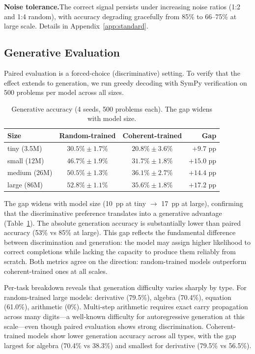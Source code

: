 \documentclass{article}
\begin{document}
\textbf{Noise tolerance.}\quad The correct signal persists under increasing noise ratios (1:2 and 1:4 random), with accuracy degrading gracefully from 85\% to 66--75\% at large scale. Details in Appendix~\ref{app:standard}.

\subsection{Generative Evaluation}
\label{sec:generative}

Paired evaluation is a forced-choice (discriminative) setting. To verify that the effect extends to generation, we run greedy decoding with SymPy verification on 500 problems per model across all sizes.

\begin{table}[t]
\centering
\begin{tabular}{lccr}
\toprule
Size & Random-trained & Coherent-trained & Gap \\
\midrule
tiny (3.5M)   & $30.5\% \pm 1.7\%$ & $20.8\% \pm 3.6\%$ & $+9.7$ pp \\
small (12M)   & $46.7\% \pm 1.9\%$ & $31.7\% \pm 1.8\%$ & $+15.0$ pp \\
medium (26M)  & $50.5\% \pm 1.3\%$ & $36.1\% \pm 2.7\%$ & $+14.4$ pp \\
large (86M)   & $52.8\% \pm 1.1\%$ & $35.6\% \pm 1.8\%$ & $+17.2$ pp \\
\bottomrule
\end{tabular}
\caption{Generative accuracy (4 seeds, 500 problems each). The gap widens with model size.}
\label{tab:generative}
\end{table}

The gap widens with model size (10~pp at tiny $\to$ 17~pp at large), confirming that the discriminative preference translates into a generative advantage (Table~\ref{tab:generative}). The absolute generation accuracy is substantially lower than paired accuracy (53\% vs 85\% at large). This gap reflects the fundamental difference between discrimination and generation: the model may assign higher likelihood to correct completions while lacking the capacity to produce them reliably from scratch. Both metrics agree on the direction: random-trained models outperform coherent-trained ones at all scales.

Per-task breakdown reveals that generation difficulty varies sharply by type. For random-trained large models: derivative (79.5\%), algebra (70.4\%), equation (61.0\%), arithmetic (0\%). Multi-step arithmetic requires exact carry propagation across many digits---a well-known difficulty for autoregressive generation at this scale---even though paired evaluation shows strong discrimination. Coherent-trained models show lower generation accuracy across all types, with the gap largest for algebra (70.4\% vs 38.3\%) and smallest for derivative (79.5\% vs 56.5\%).
\end{document}
